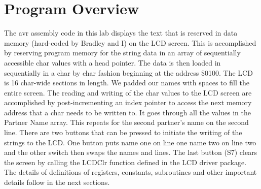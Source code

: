 \documentclass[12pt, letterpaper]{article}
\begin{document}



\section{Program Overview}

The avr assembly code in this lab displays the text that is reserved in data memory (hard-coded by Bradley and I) on the LCD screen. This is accomplished by reserving program memory for the string data in an array of sequentially accessible char values with a head pointer. The data is then loaded in sequentially in a char by char fashion beginning at the address \$0100. The LCD is 16 char-wide sections in length. We padded our names with spaces to fill the entire screen. The reading and writing of the char values to the LCD screen are accomplished by post-incrementing an index pointer to access the next memory address that a char needs to be written to. It goes through all the values in the Partner Name array. This repeats for the second partner's name on the second line. There are two buttons that can be pressed to initiate the writing of the strings to the LCD. One button puts name one on line one name two on line two and the other switch then swaps the names and lines. The last button (S7) clears the screen by calling the LCDClr function defined in the LCD driver package.
\newline
The details of definitions of registers, constants, subroutines and other important details follow in the next sections.
\end{document}
